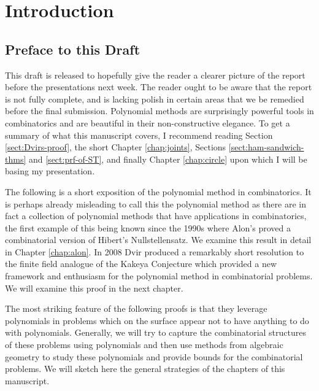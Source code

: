 \chapter{Introduction}

\section{Preface to this Draft}
This draft is released to hopefully give the reader a clearer picture of the report before the presentations next week. 
The reader ought to be aware that the report is not fully complete, and is lacking polish in certain areas that we be remedied before the final submission. Polynomial methods are surprisingly powerful tools in combinatorics and are beautiful in their non-constructive elegance. To get a summary of what this manuscript covers, I recommend reading Section \ref{sect:Dvirs-proof}, the short Chapter \ref{chap:joints}, Sections \ref{sect:ham-sandwich-thms} and \ref{sect:prf-of-ST}, and finally Chapter \ref{chap:circle} upon which I will be basing my presentation. 

 

The following is a short exposition of the polynomial method in combinatorics. 
It is perhaps already misleading to call this the polynomial method 
as there are in fact a collection of polynomial methods that have applications in combinatorics, the first example of this being known since the 1990s
where Alon's proved a combinatorial version of Hibert's Nullstellensatz.\cite{alon1999combinatorial} We examine this result in detail
in Chapter \ref{chap:alon}. In 2008 Dvir produced a remarkably short resolution to the finite field analogue of the Kakeya Conjecture which provided
a new framework and enthusiasm for the polynomial method in combinatorial problems.\cite{2008DVIR} We will examine this proof in the next chapter. 

The most striking feature of the following proofs is that they leverage polynomials in problems which on the surface appear not to have anything to 
do with polynomials. Generally, we will try to capture the combinatorial structures of these problems using polynomials and then use methods from algebraic
geometry to study these polynomials and provide bounds for the combinatorial problems.
We will sketch here the general strategies of the chapters of this manuscript.

